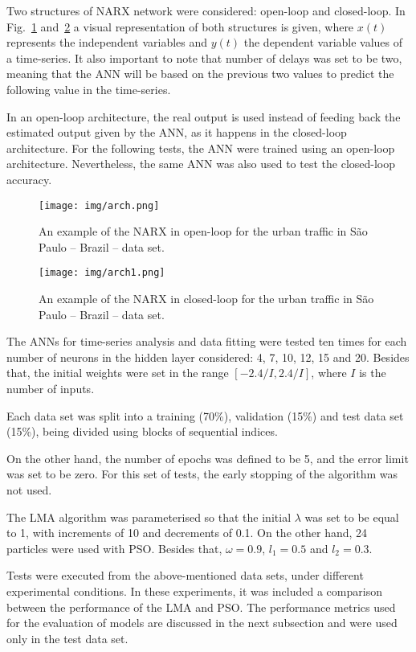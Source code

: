 Two structures of NARX network were considered: open-loop and closed-loop. In Fig.~\ref{fig:archopen} and~\ref{fig:archclosed} a visual representation of both structures is given, where $x(t)$ represents the independent variables and $y(t)$ the dependent variable values of a time-series. It also important to note that number of delays was set to be two, meaning that the ANN will be based on the previous two values to predict the following value in the time-series.

In an open-loop architecture, the real output is used instead of feeding back the estimated output given by the ANN, as it happens in the closed-loop architecture. For the following tests, the ANN were trained using an open-loop architecture. Nevertheless, the same ANN was also used to test the closed-loop accuracy. 
 
\begin{figure}[htbp]
  \centering
\texttt{[image: img/arch.png]}
  \caption{An example of the NARX in open-loop for  the urban traffic in São Paulo -- Brazil -- data set.}
  \label{fig:archopen}
\end{figure}

\begin{figure}[htbp]
  \centering
\texttt{[image: img/arch1.png]}
  \caption{An example of the NARX in closed-loop for  the urban traffic in São Paulo -- Brazil -- data set.}
  \label{fig:archclosed}
\end{figure}

The ANNs for time-series analysis and data fitting were tested ten times for each number of neurons in the hidden layer considered: 4, 7, 10, 12, 15 and 20. Besides that, the initial weights were set in the range $[-2.4/I, 2.4/I]$, where $I$ is the number of inputs. 

Each data set was split into a training (70\%), validation (15\%) and test data set (15\%), being divided using blocks of sequential indices.

On the other hand, the number of epochs was defined to be 5, and the error limit was set to be zero. For this set of tests, the early stopping of the algorithm was not used. 

The LMA algorithm was parameterised so that the initial $\lambda$ was set to be equal to 1, with increments of 10 and decrements of 0.1. On the other hand, 24 particles were used with PSO. Besides that, $\omega = 0.9$, $l_1 = 0.5$ and $l_2 = 0.3$.

Tests were executed from the above-mentioned data sets, under different experimental conditions. In these experiments, it was included a comparison between the performance of the LMA and PSO. The performance metrics used for the evaluation of models are discussed in the next subsection and were used only in the test data set. 

